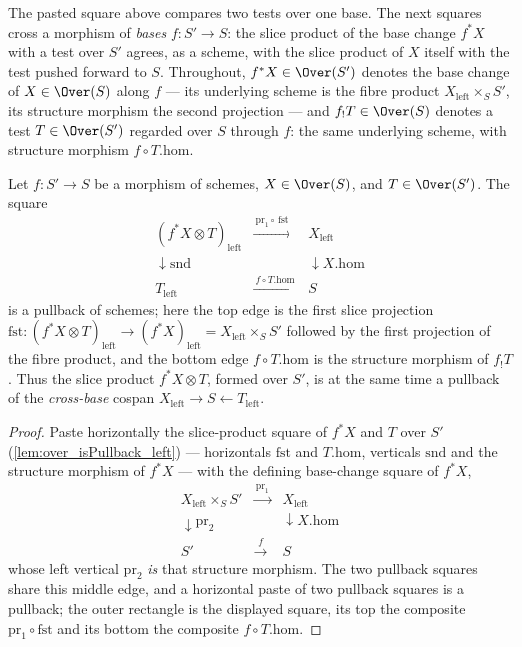 The pasted square above compares two tests over one base. The next squares cross a
morphism of \emph{bases} \(f : S' \to S\): the slice product of the base change
\(f^{*}X\) with a test over \(S'\) agrees, as a scheme, with the slice product of \(X\)
itself with the test pushed forward to \(S\). Throughout, \(f^{*}X \in \Over(S')\)
denotes the base change of \(X \in \Over(S)\) along \(f\) --- its underlying scheme is
the fibre product \(X_{\mathrm{left}} \times_S S'\), its structure morphism the second
projection --- and \(f_{!}T \in \Over(S)\) denotes a test \(T \in \Over(S')\) regarded
over \(S\) through \(f\): the same underlying scheme, with structure morphism
\(f \circ T.\mathrm{hom}\).

\begin{theorem}
  \label{thm:over_isPullback_crossBase}
  \leanok
  Let \(f : S' \to S\) be a morphism of schemes, \(X \in \Over(S)\), and
  \(T \in \Over(S')\). The square
  \[
    \begin{array}{ccc}
      (f^{*}X \otimes T)_{\mathrm{left}} &
        \xrightarrow{\ \mathrm{pr}_1 \circ\, \mathrm{fst}\ } & X_{\mathrm{left}} \\
      \downarrow \mathrm{snd} & & \downarrow X.\mathrm{hom} \\
      T_{\mathrm{left}} & \xrightarrow{\ f \circ T.\mathrm{hom}\ } & S
    \end{array}
  \]
  is a pullback of schemes; here the top edge is the first slice projection
  \(\mathrm{fst} : (f^{*}X \otimes T)_{\mathrm{left}} \to (f^{*}X)_{\mathrm{left}}
  = X_{\mathrm{left}} \times_S S'\) followed by the first projection of the fibre
  product, and the bottom edge \(f \circ T.\mathrm{hom}\) is the structure morphism of
  \(f_{!}T\). Thus the slice product \(f^{*}X \otimes T\), formed over \(S'\), is at the
  same time a pullback of the \emph{cross-base} cospan
  \(X_{\mathrm{left}} \to S \leftarrow T_{\mathrm{left}}\).
\end{theorem}
\begin{proof}
  \leanok
  Paste horizontally the slice-product square of \(f^{*}X\) and \(T\) over \(S'\)
  (\ref{lem:over_isPullback_left}) --- horizontals \(\mathrm{fst}\) and
  \(T.\mathrm{hom}\), verticals \(\mathrm{snd}\) and the structure morphism of
  \(f^{*}X\) --- with the defining base-change square of \(f^{*}X\),
  \[
    \begin{array}{ccc}
      X_{\mathrm{left}} \times_S S' & \xrightarrow{\ \mathrm{pr}_1\ } &
        X_{\mathrm{left}} \\
      \downarrow \mathrm{pr}_2 & & \downarrow X.\mathrm{hom} \\
      S' & \xrightarrow{\ f\ } & S
    \end{array}
  \]
  whose left vertical \(\mathrm{pr}_2\) \emph{is} that structure morphism. The two
  pullback squares share this middle edge, and a horizontal paste of two pullback
  squares is a pullback; the outer rectangle is the displayed square, its top the
  composite \(\mathrm{pr}_1 \circ \mathrm{fst}\) and its bottom the composite
  \(f \circ T.\mathrm{hom}\).
\end{proof}

